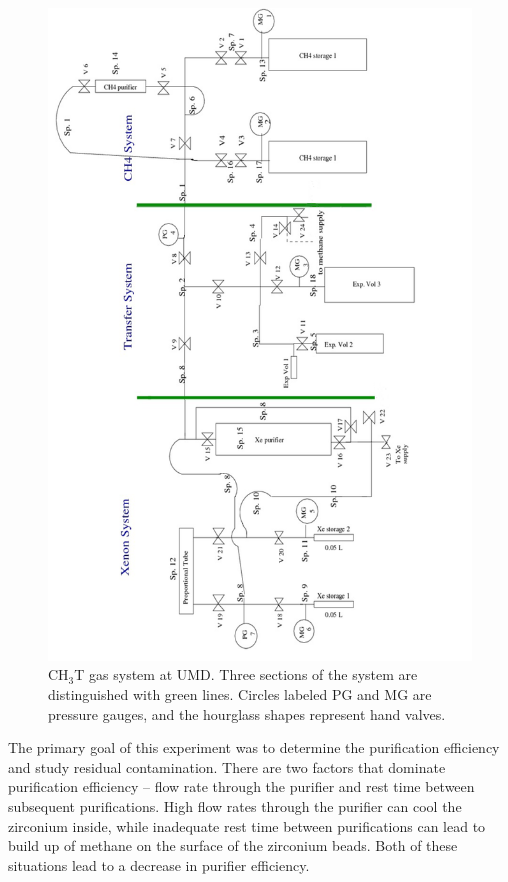 \begin{figure}
\centering
\includegraphics[scale=0.3]{GasSystem.png}
\caption{CH$_3$T gas system at UMD.  Three sections of the system are distinguished with green lines. Circles labeled PG and MG are pressure gauges, and the hourglass shapes represent hand valves.}
\label{fig:GasSys}
\end{figure}

The primary goal of this experiment was to determine the purification efficiency and study residual contamination.  There are two factors that dominate purification efficiency -- flow rate through the purifier and rest time between subsequent purifications.  High flow rates through the purifier can cool the zirconium inside, while inadequate rest time between purifications can lead to build up of methane on the surface of the zirconium beads.  Both of these situations lead to a decrease in purifier efficiency. 

